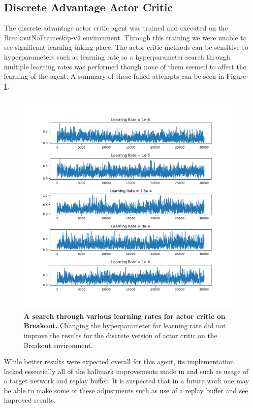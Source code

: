 \documentclass[conference]{IEEEtran}
\begin{document}
\subsection{Discrete Advantage Actor Critic}
The discrete advantage actor critic agent was trained and executed on the BreakoutNoFrameskip-v4 environment.
Through this training we were unable to see significant learning taking place.
The actor critic methods can be sensitive to hyperparameters such as learning rate so a hyperparameter search through multiple learning rates was performed though none of them seemed to affect the learning of the agent.
A summary of these failed attempts can be seen in Figure \ref{fig:actorCriticLearningRateSearch}.

\begin{figure}[htbp]
\centerline{\includegraphics[scale=0.4]{actor_critic_breakout_lr_search.png}}
\caption{\textbf{A search through various learning rates for actor critic on Breakout.}  Changing the hyperparameter for learning rate did not improve the results for the discrete version of actor critic on the Breakout environment.}
\label{fig:actorCriticLearningRateSearch}
\end{figure}

While better results were expected overall for this agent, its implementation lacked essentially all of the hallmark improvements made in \cite{DQNOriginalPaper} and \cite{NatureDeepLearning} such as usage of a target network and replay buffer.
It is suspected that in a future work one may be able to make some of these adjustments such as use of a replay buffer and see improved results.
\end{document}

